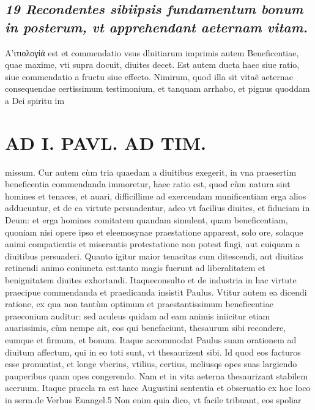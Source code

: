 \documentclass{article}
\begin{document}
\begin{pages}
\subsection*{\textit{19 Recondentes sibiipsis fundamentum bonum in posterum, vt apprehendant aeternam vitam. }}\pstart Α'ιτιολογίά est et commendatio vsus dluitiarum imprimis autem Beneficentiae, quae maxime, vti supra docuit, diuites decet. Est autem ducta haec siue ratio, siue commendatio a fructu siue effecto. Nimirum, quod illa sit vitaẽ aeternae consequendae certissimum testimonium, et tanquam arrhabo, et pignus quoddam a Dei spiritu im\pend
\section*{AD I. PAVL. AD TIM. }
\marginpar{[ p.304. ]}\pstart missum. Cur autem cùm tria quaedam a diuitibus exegerit, in vna praesertim beneficentia commendanda immoretur, haec ratio est, quod cùm natura sint homines et tenaces, et auari, difficillime ad exercendam munificentiam erga alios adducuntur, et de ea virtute persuadentur, adeo vt facilius diuites, et fiduciam in Deum: et erga homines comitatem quandam simulent, quam beneficentiam, quoniam nisi opere ipso et eleemosynae praestatione appareat, solo ore, solaque animi compatientis et miserantis protestatione non potest fingi, aut cuiquam a diuitibus persuaderi. Quanto igitur maior tenacitas cum ditescendi, aut diuitias retinendi animo coniuncta est:tanto magis fuerunt ad liberalitatem et benignitatem diuites exhortandi. Itaqueconsulto et de industria in hac virtute praecipue commendanda et praedicanda insistit Paulus.  \pend\pstart Vtitur autem ea dicendi ratione, ex qua non tantùm optimum et praestantissimum beneficentiae praeconium auditur: sed aculeus quidam ad eam animis iniicitur etiam auarissimis, cùm nempe ait, eos qui benefaciunt, thesaurum sibi recondere, eumque et firmum, et bonum. Itaque  accommodat Paulus suam orationem ad diuitum affectum, qui in eo toti sunt, vt thesaurizent sibi. Id quod eos facturos esse pronuntiat, et longe vberius, vtilius, certius, meliusqs opes suas largiendo pauperibus quam opes congerendo. Nam et in vita aeterna thesaurizant stabilem aceruum. Itaque  praecla ra est haec Augustini sententia et obseruatio ex hoc loco in serm.de Verbus  Euangel.5 Non enim quia dico, vt facile tribuant, eos spoliar  \pend

\end{pages}
\end{document}
